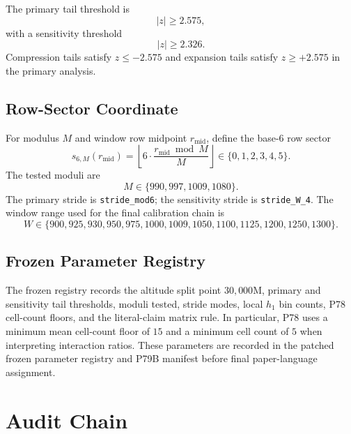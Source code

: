 \documentclass[11pt]{article}
\newcommand{\zprimary}{2.575}
\newcommand{\zsensitivity}{2.326}
\begin{document}
The primary tail threshold is
\begin{equation}
    |z| \geq \zprimary,
    \label{eq:primary_tail}
\end{equation}
with a sensitivity threshold
\begin{equation}
    |z| \geq \zsensitivity.
    \label{eq:sensitivity_tail}
\end{equation}
Compression tails satisfy $z\leq -\zprimary$ and expansion tails
satisfy $z\geq +\zprimary$ in the primary analysis.

\subsection{Row-Sector Coordinate}

For modulus $M$ and window row midpoint $r_{\mathrm{mid}}$, define the
base-6 row sector
\begin{equation}
    s_{6,M}(r_{\mathrm{mid}})
    = \left\lfloor 6 \cdot \frac{r_{\mathrm{mid}} \bmod M}{M}
      \right\rfloor \in \{0,1,2,3,4,5\}.
    \label{eq:sector}
\end{equation}
The tested moduli are
\begin{equation}
    M \in \{990, 997, 1009, 1080\}.
\end{equation}
The primary stride is \texttt{stride\_mod6}; the sensitivity stride is
\texttt{stride\_W\_4}. The window range used for the final calibration
chain is
\begin{equation}
W \in \{900,925,930,950,975,1000,1009,1050,1100,1125,1200,1250,1300\}.
\end{equation}

\subsection{Frozen Parameter Registry}

The frozen registry records the altitude split point
$30{,}000\mathrm{M}$, primary and sensitivity tail thresholds, moduli
tested, stride modes, local $h_1$ bin counts, P78 cell-count floors,
and the literal-claim matrix rule. In particular, P78 uses a minimum
mean cell-count floor of $15$ and a minimum cell count of $5$ when
interpreting interaction ratios. These parameters are recorded in the
patched frozen parameter registry and P79B manifest before final
paper-language assignment.

\section{Audit Chain}
\label{sec:audit_chain}
\end{document}
